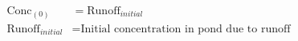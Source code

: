 \documentclass[fleqn, oneside, 11pt]{article}%
\begin{document}
\begin{preview}
\begin{align*}%
\text{Conc}_{(0)} & = \text{Runoff}_{initial} \nonumber \\
\text{Runoff}_{initial} & = \text{Initial concentration in pond due to runoff} \nonumber \\
\end{align*} 
\end{preview}
\end{document}
